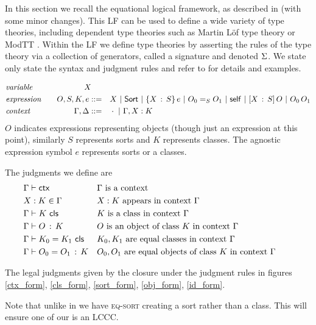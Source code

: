 In this section we recall the equational logical framework,
as described in \cite{harper2021equational} (with some minor changes).
This LF can be used to define a wide variety of type theories,
including dependent type theories such as Martin L{\"o}f type theory or
\textsf{ModTT} \cite{Sterling_2021}.
Within the LF we define type theories by asserting the rules of the type theory
via a collection of generators, called a signature and denoted $\Sigma$.
We state only state the syntax and judgment rules
and refer to \cite{harper2021equational} for details and examples.

\begin{align*}
  &\textit{variable} \quad & X {\color{white} ::=} \quad & \\
  &\textit{expression} \quad & O, S, K, e ::= \quad & X \BNFSep \SortCS \BNFSep \PiCS{X}{S}{e}
                                     \BNFSep \EqCS{S}{O_{0}}{O_{1}} \BNFSep \SelfCS \BNFSep \LamCS{X}{S}{O} \BNFSep \ApCS{O_{0}}{O_{1}} \\
  &\textit{context} \quad & \Ga, \De ::= \quad & \cdot \BNFSep \CtxExt{\Ga}{X}{K}
\end{align*}
$O$ indicates expressions representing objects
(though just an expression at this point),
similarly $S$ represents sorts and $K$ represents classes.
The agnostic expression symbol $e$ represents sorts or a classes.

The judgments we define are
\begin{align*}
  &\Gamma \vdash \mathsf{ctx} && \Gamma \text{ is a context }  \\
  &X:K \in \Gamma && X:K \text{ appears in context } \Gamma \\
  &\Gamma \vdash K \,\, \mathsf{cls} && K \text{ is a class in context } \Gamma \\
  &\Gamma \vdash O \, : \, K && O \text{ is an object of class } K
    \text{ in context } \Gamma && \\
  &\Gamma \vdash K_{0} = K_{1} \,\, \mathsf{cls} && K_{0}, K_{1}
    \text{ are equal classes in context } \Gamma \\
  &\Gamma \vdash O_{0} = O_{1} \, : \, K && O_{0},O_{1}
    \text{ are equal objects of class } K
    \text{ in context } \Gamma
\end{align*}

The legal judgments given by the closure under the judgment rules
in figures \ref{ctx_form}, \ref{cls_form}, \ref{sort_form}, \ref{obj_form},
\ref{id_form}.

Note that unlike in \cite{harper2021equational} we have \textsc{eq-sort}
creating a sort rather than a class.
This will ensure one of our  is an LCCC.

